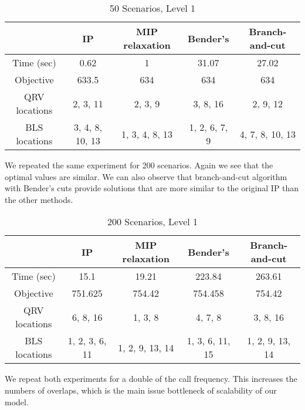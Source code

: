 \documentclass[12pt]{report}
\begin{document}
\begin{table}[h]
    \centering
    \caption{50 Scenarios, Level 1 \label{tbl:50L1}}
    \begin{tabular}{SSSSS} \toprule
        {} & {IP} & {MIP relaxation} & {Bender's} & {Branch-and-cut} \\ \midrule
        {Time (sec)}                   & 0.62   & 1 & 31.07 & 27.02 \\
        {Objective}              & 633.5  & 634 & 634  & 634 \\
        {QRV locations}  & 
        {2, 3, 11} &
        {2, 3, 9} & 
        {3, 8, 16} & 
        {2, 9, 12} \\
        {BLS locations}  & 
        {3, 4, 8, 10, 13} & 
        {1, 3, 4, 8, 13} & 
        {1, 2, 6, 7, 9} & 
        {4, 7, 8, 10, 13} \\
     \bottomrule
    \end{tabular}
\end{table}

We repeated the same experiment for 200 scenarios.
Again we see that the optimal values are similar.
We can also observe that branch-and-cut algorithm with Bender's cuts provide solutions that are more similar to the original IP than the other methods.

\begin{table}[h]
    \centering
    \caption{200 Scenarios, Level 1 \label{tbl:50L1}}
    \begin{tabular}{SSSSS} \toprule
        {} & {IP} & {MIP relaxation} & {Bender's} & {Branch-and-cut} \\ \midrule
        {Time (sec)} & 15.1   & 19.21    & 223.84    & 263.61 \\
        {Objective}  & 751.625  & 754.42 & 754.458   & 754.42 \\
        {QRV locations}  & 
        {6, 8, 16} &
        {1, 3, 8} & 
        {4, 7, 8} & 
        {3, 8, 16} \\
        {BLS locations}  & 
        {1, 2, 3, 6, 11} & 
        {1, 2, 9, 13, 14} & 
        {1, 3, 6, 11, 15} & 
        {1, 2, 9, 13, 14} \\
     \bottomrule
    \end{tabular}
\end{table}

We repeat both experiments for a double of the call frequency.
This increases the numbers of overlaps, which is the main issue bottleneck of scalability of our model.
\end{document}
